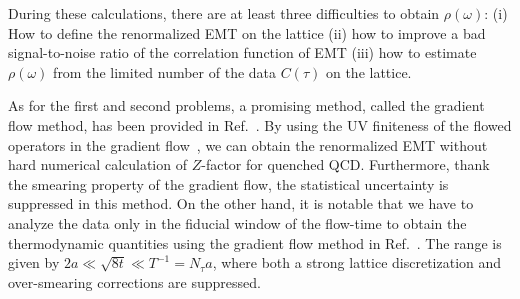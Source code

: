 \documentclass[a4paper,11pt]{article}
\begin{document}
During these calculations, there are at least three difficulties to obtain $\rho(\omega)$:
(i) How to define the renormalized EMT on the lattice (ii) how to improve a bad signal-to-noise ratio of the correlation function of EMT (iii) how to estimate $\rho(\omega)$ from the limited number of the data $C(\tau)$ on the lattice.

As for the first and second problems, a promising method, called the gradient flow method, has been provided in Ref.~\cite{Suzuki:2013gza,Asakawa:2013laa}.
By using the UV finiteness of the flowed operators in the gradient flow~\cite{Luscher:2010iy,Luscher:2011bx},
we can obtain the renormalized EMT without hard numerical calculation of $Z$-factor for quenched QCD.
Furthermore, thank  the smearing property of the gradient flow, the statistical uncertainty is suppressed in this method.
On the other hand, it is notable that we have to analyze the data only in the fiducial window of the flow-time to obtain the thermodynamic quantities using the gradient flow method in Ref.~\cite{Asakawa:2013laa}.
The range is given by $2a \ll \sqrt{8t} \ll T^{-1} = N_\tau a$, where both a strong lattice discretization and  over-smearing corrections are suppressed.
\end{document}
